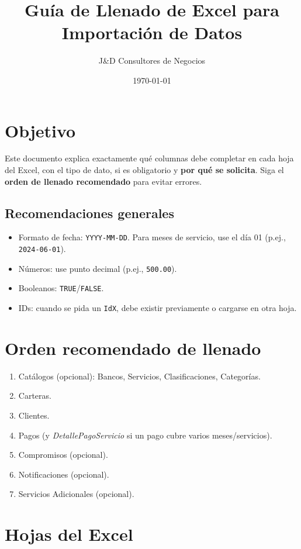\documentclass[11pt,a4paper]{article}
\title{Guía de Llenado de Excel para Importación de Datos}
\author{J\&D Consultores de Negocios}
\date{\today}
\begin{document}
\maketitle

\section*{Objetivo}
Este documento explica exactamente qué columnas debe completar en cada hoja del Excel, con el tipo de dato, si es obligatorio y \textbf{por qué se solicita}. Siga el \textbf{orden de llenado recomendado} para evitar errores.

\subsection*{Recomendaciones generales}
\begin{itemize}
  \item Formato de fecha: \texttt{YYYY-MM-DD}. Para meses de servicio, use el día 01 (p.ej., \texttt{2024-06-01}).
  \item N\'umeros: use punto decimal (p.ej., \texttt{500.00}).
  \item Booleanos: \texttt{TRUE}/\texttt{FALSE}.
  \item IDs: cuando se pida un \texttt{IdX}, debe existir previamente o cargarse en otra hoja.
\end{itemize}

\section{Orden recomendado de llenado}
\begin{enumerate}
  \item Catálogos (opcional): Bancos, Servicios, Clasificaciones, Categorías.
  \item Carteras.
  \item Clientes.
  \item Pagos (y \emph{DetallePagoServicio} si un pago cubre varios meses/servicios).
  \item Compromisos (opcional).
  \item Notificaciones (opcional).
  \item Servicios Adicionales (opcional).
\end{enumerate}

\section{Hojas del Excel}
\end{document}
